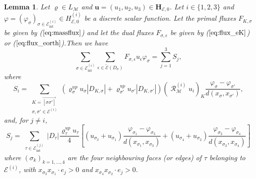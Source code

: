 \documentclass{amsart}
\newtheorem{lm}{Lemma}
\numberwithin{equation}{section}
\begin{document}
\begin{lm}\label{lem-alge2}
Let ${\varrho} \in L_{{\mathcal M}}$ and ${{\boldsymbol u}}=(u_1,u_2,u_3) \in {{\mathbf{H}_{{{\mathcal E}},0}}}$.
Let $i \in \{1,2,3\}$ and $\varphi = (\varphi_{{\sigma}})_{{{\sigma}} \in {{\mathcal E}_{\mathrm{int}}^{(i)}}} \in {H_{{{\mathcal E}},0}^{(i)}}$ be a discrete scalar function. Let the primal fluxes $F_{K,{{\sigma}}}$ be given by ($\ref{eq:massflux}$) and let the dual fluxes $F_{{{\sigma}},{\epsilon}} $ be given by ($\ref{eq:flux_eK}$) or ($\ref{eq:flux_eorth}$).Then we have
\begin{equation*}
  \sum_{{{\sigma}} \in {{\mathcal E}_{\mathrm{int}}^{(i)}}} \sum_{{\epsilon} \in {\widetilde {{\mathcal E}}}(D_{{\sigma}})}
F_{{{\sigma}},{\epsilon}} u_{\epsilon} \varphi_{{\sigma}}= \sum_{j=1}^3 S_{j},
\end{equation*} 
where
\[
    S_i  = \sum_{\substack{K =  \overrightarrow{[{{\sigma}} {{\sigma}}']}\\ {{\sigma}}, {{\sigma}}' \in {\mathcal {E}^{(i)}}}}
    ({\varrho}_{{\sigma}}^{up} u_{{\sigma}} |D_{ K,{{\sigma}}}| + {\varrho}_{{{\sigma}}'}^{up} u_{{{\sigma}}'} |D_{ K,{{\sigma}}'}|)(\operatorname{{\mathcal{R}}}_{{\mathcal M}}^{(i)}u_i)_K
    \frac {\varphi_{{\sigma}} - \varphi_{{{\sigma}}'}}{d(x_{{\sigma}}, x_{{{\sigma}}'})},
\]
and, for $j \ne i$,
\[
    S_{j} = \sum_{\substack{{\tau} \in {{\mathcal E}_{\mathrm{int}}^{(j)}}}} |D_{\tau} | \frac{ {\varrho}^{up}_{\tau} u_{\tau}}{4} \left[  \left(   {u_{{{\sigma}}_3}+u_{{{\sigma}}_1}}\right) \frac {\varphi_{{{\sigma}}_1} - \varphi_{{{\sigma}}_3}}{d(x_{{{\sigma}}_1},x_{{{\sigma}}_3})} +  \left(   {u_{{{\sigma}}_4}+u_{{{\sigma}}_2}}\right) \frac {\varphi_{{{\sigma}}_2} - \varphi_{{{\sigma}}_4}}{d(x_{{{\sigma}}_2},x_{{{\sigma}}_4})}    \right]
\]
where $({{\sigma}}_k)_{k=1,\ldots,4}$ are the four neighbouring faces (or edges) of ${\tau}$ belonging to ${\mathcal {E}^{(i)}}$, with 
$x_{{{\sigma}}_3}  x_{{{\sigma}}_1} \cdot e_j>0$ and $x_{{{\sigma}}_4}  x_{{{\sigma}}_2} \cdot e_j >0$.
 \end{lm}
\end{document}
